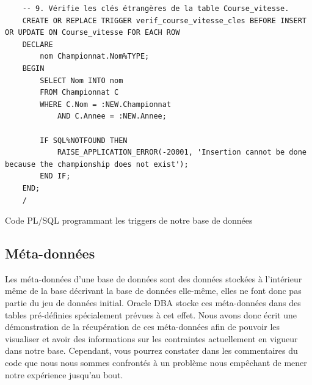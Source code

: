 \documentclass[12pt,a4paper]{article}
\newenvironment{code}{\captionsetup{type=listing}}{}
\begin{document}
\begin{code}
\begin{verbatim}
    -- 9. Vérifie les clés étrangères de la table Course_vitesse.
    CREATE OR REPLACE TRIGGER verif_course_vitesse_cles BEFORE INSERT OR UPDATE ON Course_vitesse FOR EACH ROW
    DECLARE
        nom Championnat.Nom%TYPE;
    BEGIN
        SELECT Nom INTO nom
        FROM Championnat C
        WHERE C.Nom = :NEW.Championnat
            AND C.Annee = :NEW.Annee;

        IF SQL%NOTFOUND THEN
            RAISE_APPLICATION_ERROR(-20001, 'Insertion cannot be done because the championship does not exist');
        END IF;
    END;
    /
    \end{verbatim}
    \caption{Code PL/SQL programmant les triggers de notre base de données}
    \label{lst.triggers}
\end{code}

\subsection{Méta-données}
\label{sub.metadata}

Les méta-données d'une base de données sont des données stockées à l’intérieur
même de la base décrivant la base de données elle-même, elles ne font donc pas
partie du jeu de données initial. Oracle DBA stocke ces méta-données dans des
tables pré-définies spécialement prévues à cet effet. Nous avons donc écrit une
démonstration de la récupération de ces méta-données afin de pouvoir les
visualiser et avoir des informations sur les contraintes actuellement en vigueur
dans notre base. Cependant, vous pourrez constater dans les commentaires du code
que nous nous sommes confrontés à un problème nous empêchant de mener notre
expérience jusqu’au bout.
\end{document}
